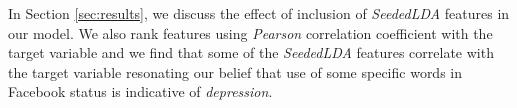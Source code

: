 In Section \ref{sec:results}, we discuss the effect of inclusion of \textit{SeededLDA} features in our model. We also rank features using \textit{Pearson} correlation coefficient with the target variable and we find that some of the \textit{SeededLDA} features correlate with the target variable resonating our belief that use of some specific words in Facebook status is indicative of \textit{depression}.

